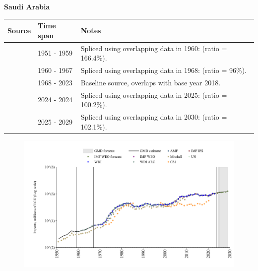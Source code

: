 \documentclass[12pt,a4paper,landscape]{article}
\begin{document}
\begin{adjustbox}{max totalsize={\paperwidth}{\paperheight},center}
\begin{minipage}[t][\textheight][t]{\textwidth}
\vspace*{0.5cm}
{}
\begin{center}
{\Large\bfseries Saudi Arabia}
\end{center}
\vspace{0.5cm}
\begin{table}[H]
\centering
\small
\begin{tabular}{|l|l|l|}
\hline
\textbf{Source} & \textbf{Time span} & \textbf{Notes} \\
\hline
\rowcolor{white}\cite{Mitchell}& 1951 - 1959 &Spliced using overlapping data in 1960: (ratio = 166.4\%).\\
\rowcolor{lightgray}\cite{WDI_ARC}& 1960 - 1967 &Spliced using overlapping data in 1968: (ratio = 96\%).\\
\rowcolor{white}\cite{WDI}& 1968 - 2023 &Baseline source, overlaps with base year 2018.\\
\rowcolor{lightgray}\cite{IMF_IFS}& 2024 - 2024 &Spliced using overlapping data in 2025: (ratio = 100.2\%).\\
\rowcolor{white}\cite{IMF_WEO_forecast}& 2025 - 2029 &Spliced using overlapping data in 2030: (ratio = 102.1\%).\\
\hline
\end{tabular}
\end{table}
\begin{figure}[H]
\centering
\includegraphics[width=\textwidth,height=0.6\textheight,keepaspectratio]{graphs/SAU_imports.pdf}
\end{figure}
\end{minipage}
\end{adjustbox}
\end{document}
